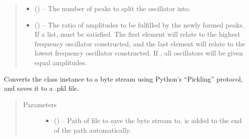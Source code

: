 \documentclass[letterpaper,10pt,english]{sphinxmanual}
\begin{document}
\begin{fulllineitems}
\begin{fulllineitems}
\begin{quote}
\begin{description}
\begin{itemize}
\item {} 
\sphinxAtStartPar
{} (\sphinxstyleliteralemphasis{\sphinxupquote{, }}) – The number of peaks to split the oscillator into.

\item {} 
\sphinxAtStartPar
{} (\sphinxstyleliteralemphasis{\sphinxupquote{, }}) – The ratio of amplitudes to be fulfilled by the newly formed
peaks. If a list,  must be
satisfied. The first element will relate to the highest
frequency oscillator constructed, and the last element will
relate to the lowest frequency oscillator constructed. If ,
all oscillators will be given equal amplitudes.

\end{itemize}

\end{description}\end{quote}

\end{fulllineitems}


\begin{fulllineitems}
\label{\detokenize{references/core:nmrespy.core.Estimator.to_pickle}}
\sphinxAtStartPar
Converts the class instance to a byte stream using Python’s
“Pickling” protocol, and saves it to a .pkl file.
\begin{quote}\begin{description}
\item[{Parameters}] \leavevmode\begin{itemize}
\item {} 
\sphinxAtStartPar
{} (\sphinxstyleliteralemphasis{\sphinxupquote{, }}) – Path of file to save the byte stream to.   is added to the end of the path
automatically.


\end{itemize}
\end{description}
\end{quote}
\end{fulllineitems}
\end{fulllineitems}
\end{document}
